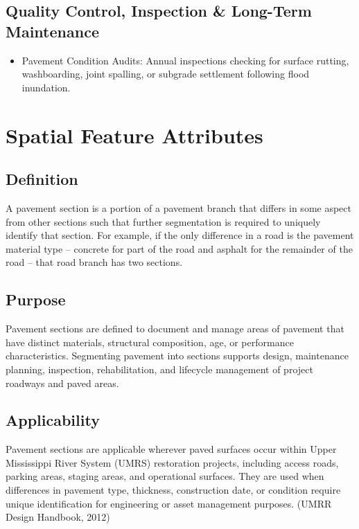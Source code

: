 \documentclass[
  letterpaper,
  DIV=11,
  numbers=noendperiod]{scrreprt}
\providecommand{\tightlist}{%
  \setlength{\itemsep}{0pt}\setlength{\parskip}{0pt}}
\begin{document}
\subsection{Quality Control, Inspection \& Long-Term
Maintenance}\label{quality-control-inspection-long-term-maintenance-21}

\begin{itemize}
\tightlist
\item
  Pavement Condition Audits: Annual inspections checking for surface
  rutting, washboarding, joint spalling, or subgrade settlement
  following flood inundation.
\end{itemize}

\section{Spatial Feature Attributes}\label{spatial-feature-attributes-5}

\subsection{Definition}\label{definition-21}

A pavement section is a portion of a pavement branch that differs in
some aspect from other sections such that further segmentation is
required to uniquely identify that section. For example, if the only
difference in a road is the pavement material type -- concrete for part
of the road and asphalt for the remainder of the road -- that road
branch has two sections.

\subsection{Purpose}\label{purpose-25}

Pavement sections are defined to document and manage areas of pavement
that have distinct materials, structural composition, age, or
performance characteristics. Segmenting pavement into sections supports
design, maintenance planning, inspection, rehabilitation, and lifecycle
management of project roadways and paved areas.

\subsection{Applicability}\label{applicability-22}

Pavement sections are applicable wherever paved surfaces occur within
Upper Mississippi River System (UMRS) restoration projects, including
access roads, parking areas, staging areas, and operational surfaces.
They are used when differences in pavement type, thickness, construction
date, or condition require unique identification for engineering or
asset management purposes. (UMRR Design Handbook, 2012)
\end{document}
